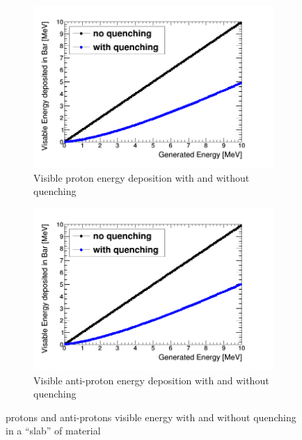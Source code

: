 \begin{figure}[htbp]
\centering
\begin{subfigure}{.5\textwidth}
  \centering
  \includegraphics[width=\linewidth]{quench_eng_protons.png}
  \captionsetup{width=.9\linewidth}
  \caption{Visible proton energy deposition with and without quenching}
  \label{subFig:proton_quenched_and_not}
\end{subfigure}%
\begin{subfigure}{.5\textwidth}
  \centering
  \includegraphics[width=\linewidth]{quench_eng_Aprotons.png}
  \captionsetup{width=.9\linewidth}
  \caption{Visible anti-proton energy deposition with and without quenching}
  \label{subFig:Aproton_quenched_and_not}
\end{subfigure}
\caption{protons and anti-protons visible energy with and without quenching in a ``slab'' of material}
\label{fig:proton_Apronton_quenched_and_not}
\end{figure}

